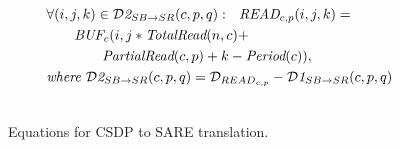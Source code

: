 \begin{figure}[ht]
{\begin{minipage}{6.3in}
\begin{itemize}
\begin{align}
%
%
&\forall (i,j,k) \in {{\cal D}\mt{2}}_{SB \rightarrow SR}(c,p,q):~~
\mt{READ}_{c, p}(i,j,k) = \nonumber\\
    &~~~~~~\mt{BUF}_{c}(i,
                  j*\mt{TotalRead}(n,c) + \\\nonumber
                    &~~~~~~~~~~~~\mt{PartialRead}(c,p)
		+ k - \mt{Period}(c)),\\ \nonumber&
\mt{where }{{\cal D}\mt{2}}_{SB \rightarrow SR}(c,p,q) = 
  {\cal D}_{{READ}_{c, p}} - {{\cal D}\mt{1}}_{SB \rightarrow SR}(c,p,q)\\ \nonumber \\
%
%
%
\end{align}
\vspace{-12pt}
\end{itemize}
\end{minipage}}
\caption{Equations for CSDP to SARE translation.
\protect\label{fig:pcptosare3}}
\end{figure}